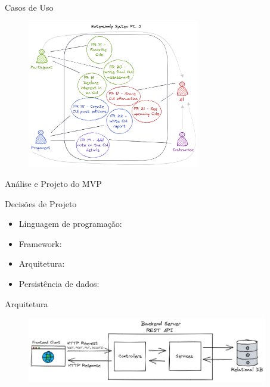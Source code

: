 \begin{frame}{{\sffamily Casos de Uso}}
    \begin{figure}
        \vfill
        \includegraphics[width=7.5cm, ]{imagens/6-use-case-2.png}
        \vfill
    \end{figure}
\end{frame}

\begin{frame}{{\sffamily Análise e Projeto do MVP}}
\begin{block}{Decisões de Projeto}
    \begin{itemize}
        \item Linguagem de programação: 
        \item Framework: 
        \item Arquitetura: 
        \item Persistência de dados:
    \end{itemize}
\end{block}
\end{frame}

\begin{frame}{{\sffamily Arquitetura}}
    \begin{figure}
        \vfill
        \includegraphics[width=10.5cm, ]{imagens/6-architecture.png}
        \vfill
    \end{figure}

\end{frame}

